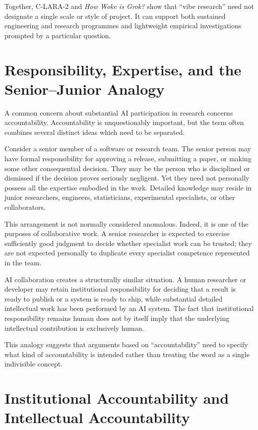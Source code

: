 Together, C-LARA-2 and \emph{How Woke is Grok?} show that ``vibe research'' need not designate a single scale or style of project. It can support both sustained engineering and research programmes and lightweight empirical investigations prompted by a particular question.


\section{Responsibility, Expertise, and the Senior--Junior Analogy}

A common concern about substantial AI participation in research concerns accountability. Accountability is unquestionably important, but the term often combines several distinct ideas which need to be separated.

Consider a senior member of a software or research team. The senior person may have formal responsibility for approving a release, submitting a paper, or making some other consequential decision. They may be the person who is disciplined or dismissed if the decision proves seriously negligent. Yet they need not personally possess all the expertise embodied in the work. Detailed knowledge may reside in junior researchers, engineers, statisticians, experimental specialists, or other collaborators.

This arrangement is not normally considered anomalous. Indeed, it is one of the purposes of collaborative work. A senior researcher is expected to exercise sufficiently good judgment to decide whether specialist work can be trusted; they are not expected personally to duplicate every specialist competence represented in the team.

AI collaboration creates a structurally similar situation. A human researcher or developer may retain institutional responsibility for deciding that a result is ready to publish or a system is ready to ship, while substantial detailed intellectual work has been performed by an AI system. The fact that institutional responsibility remains human does not by itself imply that the underlying intellectual contribution is exclusively human.

This analogy suggests that arguments based on ``accountability'' need to specify what kind of accountability is intended rather than treating the word as a single indivisible concept.


\section{Institutional Accountability and Intellectual Accountability}


